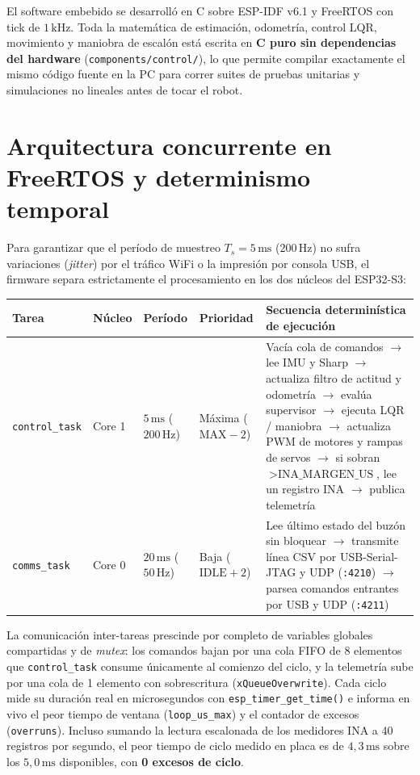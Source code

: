 \documentclass[11pt,a4paper]{report}
\newcommand{\ud}[1]{\,\mathrm{#1}}
\begin{document}
\begin{idea}
El software embebido se desarrolló en C sobre ESP-IDF v6.1 y FreeRTOS con tick de $1\ud{kHz}$.
Toda la matemática de estimación, odometría, control LQR, movimiento y maniobra de escalón está
escrita en \textbf{C puro sin dependencias del hardware} (\texttt{components/control/}), lo que
permite compilar exactamente el mismo código fuente en la PC para correr suites de pruebas
unitarias y simulaciones no lineales antes de tocar el robot.
\end{idea}

\section{Arquitectura concurrente en FreeRTOS y determinismo temporal}

Para garantizar que el período de muestreo $T_s = 5\ud{ms}$ ($200\ud{Hz}$) no sufra
variaciones (\emph{jitter}) por el tráfico WiFi o la impresión por consola USB, el firmware
separa estrictamente el procesamiento en los dos núcleos del ESP32-S3:

\begin{center}
\begin{tabular}{@{}llllp{6.6cm}@{}}
\toprule
\textbf{Tarea} & \textbf{Núcleo} & \textbf{Período} & \textbf{Prioridad} & \textbf{Secuencia determinística de ejecución} \\
\midrule
\texttt{control\_task} & Core 1 & $5\ud{ms}$ ($200\ud{Hz}$) & Máxima ($\text{MAX}-2$) & Vacía cola de comandos $\to$ lee IMU y Sharp $\to$ actualiza filtro de actitud y odometría $\to$ evalúa supervisor $\to$ ejecuta LQR / maniobra $\to$ actualiza PWM de motores y rampas de servos $\to$ si sobran $> \text{INA\_MARGEN\_US}$, lee un registro INA $\to$ publica telemetría \\
\texttt{comms\_task} & Core 0 & $20\ud{ms}$ ($50\ud{Hz}$) & Baja ($\text{IDLE}+2$) & Lee último estado del buzón sin bloquear $\to$ transmite línea CSV por USB-Serial-JTAG y UDP (\texttt{:4210}) $\to$ parsea comandos entrantes por USB y UDP (\texttt{:4211}) \\
\bottomrule
\end{tabular}
\end{center}

La comunicación inter-tareas prescinde por completo de variables globales compartidas y de
\emph{mutex}: los comandos bajan por una cola FIFO de 8 elementos que \texttt{control\_task}
consume únicamente al comienzo del ciclo, y la telemetría sube por una cola de 1 elemento con
sobrescritura (\texttt{xQueueOverwrite}). Cada ciclo mide su duración real en microsegundos con
\texttt{esp\_timer\_get\_time()} e informa en vivo el peor tiempo de ventana (\texttt{loop\_us\_max})
y el contador de excesos (\texttt{overruns}). Incluso sumando la lectura escalonada de los
medidores INA a 40 registros por segundo, el peor tiempo de ciclo medido en placa es de
$4{,}3\ud{ms}$ sobre los $5{,}0\ud{ms}$ disponibles, con \textbf{0 excesos de ciclo}.
\end{document}
